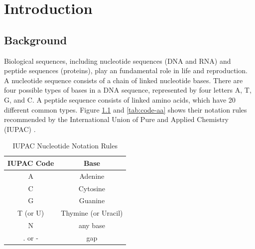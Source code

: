 \chapter{Introduction}\label{chap:Introduction}

\section{Background}

Biological sequences, including nucleotide sequences (DNA and RNA) and peptide sequences (proteins), play an fundamental role in life and reproduction. A nucleotide sequence consists of a chain of linked nucleotide bases. There are four possible types of bases in a DNA sequence, represented by four letters A, T, G, and C. A peptide sequence consists of linked amino acids, which have 20 different common types. Figure \ref{tab:code-dna} and \ref{tab:code-aa} shows their notation rules recommended by the International Union of Pure and Applied Chemistry (IUPAC) \cite{Cornish-Bowden:1985lr}.

\begin{table}[hbt]
\centering\small
\caption{IUPAC Nucleotide Notation Rules}\label{tab:code-dna}
\begin{tabular}{cc} \toprule
  IUPAC Code  & Base                \\ \hline
  A           & Adenine             \\
  C           & Cytosine            \\
  G           & Guanine             \\
  T (or U)    & Thymine (or Uracil) \\
  N           & any base            \\
  . or -      & gap                 \\ \bottomrule
\end{tabular}
\end{table}

